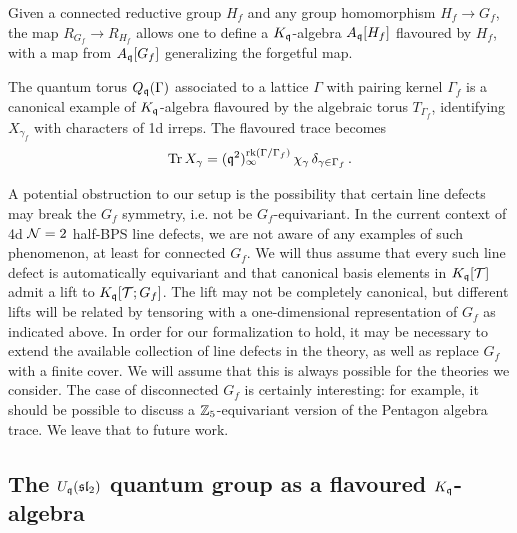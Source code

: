 \documentclass[12pt]{amsart}
\begin{document}
\begin{remark}
\label{rem:flavour-change}
	Given a connected reductive group $H_f$ and any group homomorphism $H_f \to G_f$, the map $R_{G_f} \to R_{H_f}$ allows one to define a $K_{\mathfrak{q}}$-algebra $A_{\mathfrak{q}}[H_f]$ flavoured by $H_f$, with a map from $A_{\mathfrak{q}}[G_f]$ generalizing the forgetful map.
\end{remark}

\begin{example}
\label{ex:qt-flavoured}
The quantum torus $Q_{\mathfrak{q}}(\Gamma)$ associated to a lattice $\Gamma$ with pairing
kernel $\Gamma_f$ is a canonical example of $K_{\mathfrak{q}}$-algebra flavoured by the
algebraic torus $T_{\Gamma_f}$, identifying $X_{\gamma_f}$ with characters of
1d irreps.  The flavoured trace becomes
\begin{equation}\label{eq:qt-flavoured-trace}
  \operatorname{Tr} X_\gamma = (\mathfrak{q}^2)_\infty^{\operatorname{rk}(\Gamma/\Gamma_f)}\, \chi_{\gamma}\,
                 \delta_{\gamma \in \Gamma_f}\,.
\end{equation}
\end{example}

\begin{remark}
\label{rem:flavour-comments}
A potential obstruction to our setup is the possibility that certain line defects may break the $G_f$ symmetry, i.e. not be $G_f$-equivariant. In the current context of 4d ${\cal N}=2$ half-BPS line defects, we are not aware of any examples 
of such phenomenon, at least for connected $G_f$. We will thus assume that every such line defect is automatically equivariant and that canonical basis elements in $K_{\mathfrak{q}}[{\mathcal T}]$ admit a lift to $K_{\mathfrak{q}}[{\mathcal T};G_f]$. The lift may not be completely canonical, but different lifts will be related by tensoring with a one-dimensional  
representation of $G_f$ as indicated above. In order for our formalization to hold, it may be necessary to extend the available collection of line defects in the theory, 
as well as replace $G_f$ with a finite cover. We will assume that this is always possible for the theories we consider. The case of disconnected $G_f$ is certainly interesting: for example, it should be possible to discuss a $\mathbb{Z}_5$-equivariant version of the Pentagon algebra trace. We leave that to future work. 
\end{remark}

\subsection{The $U_{\mathfrak{q}}(\mathfrak{sl}_2)$ quantum group as a flavoured $K_{\mathfrak{q}}$-algebra}
\label{sec:uqsl2}
\end{document}
